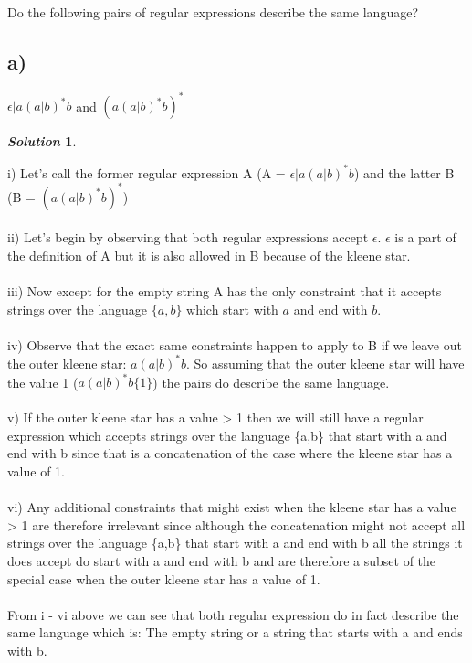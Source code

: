 \documentclass[11pt, a4paper]{article}
\newtheorem*{solution}{\emph{Solution}}
\begin{document}
\section{}
	Do the following pairs of regular expressions describe the same language?
	\subsection*{a)}
		$\epsilon|a(a|b)^{*}b$ and $(a(a|b)^{*}b)^{*}$
		\begin{solution}
		\end{solution}
		i) Let's call the former regular expression A (A = $\epsilon|a(a|b)^{*}b$) and the latter B (B =  $(a(a|b)^{*}b)^{*}$)\\~\\
		ii) Let's begin by observing that both regular expressions accept $\epsilon$. $\epsilon$ is a part of the definition of A but it is also allowed in B because of the kleene star. \\~\\
		iii) Now except for the empty string A has the only constraint that it accepts strings over the language $\{a,b\}$ which start with $a$ and end with $b$.\\~\\
		iv) Observe that the exact same constraints happen to apply to B if we leave out the outer kleene star: $a(a|b)^{*}b$. So assuming that the outer kleene star will have the value 1 ($a(a|b)^{*}b\{1\}$) the pairs do describe the same language. \\~\\
		v) If the outer kleene star has a value > 1 then we will still have a regular expression which accepts strings over the language \{a,b\} that start with a and end with b since that is a concatenation of the case where the kleene star has a value of 1. \\~\\
		vi) Any additional constraints that might exist when the kleene star has a value > 1 are therefore irrelevant since although the concatenation might not accept all strings over the language \{a,b\} that start with a and end with b all the strings it does accept do start with a and end with b and are therefore a subset of the special case when the outer kleene star has a value of 1.\\~\\
		From i - vi above we can see that both regular expression do in fact describe the same language which is: The empty string or a string that starts with a and ends with b.
\end{document}
